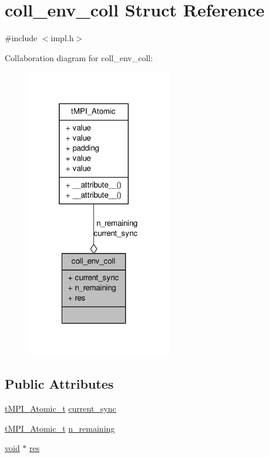 \hypertarget{structcoll__env__coll}{\section{coll\-\_\-env\-\_\-coll \-Struct \-Reference}
\label{structcoll__env__coll}
}


{\ttfamily \#include $<$impl.\-h$>$}



\-Collaboration diagram for coll\-\_\-env\-\_\-coll\-:
\nopagebreak
\begin{figure}[H]
\begin{center}
\leavevmode
\includegraphics[width=181pt]{structcoll__env__coll__coll__graph}
\end{center}
\end{figure}
\subsection*{\-Public \-Attributes}
\begin{DoxyCompactItemize}
\item 
\hyperlink{include_2thread__mpi_2atomic_2gcc_8h_a2c33794dc540e3b07cffc1f81a3fe4b4}{t\-M\-P\-I\-\_\-\-Atomic\-\_\-t} \hyperlink{structcoll__env__coll_aa9b2d9a0eda944f592443e26f2ede8de}{current\-\_\-sync}
\item 
\hyperlink{include_2thread__mpi_2atomic_2gcc_8h_a2c33794dc540e3b07cffc1f81a3fe4b4}{t\-M\-P\-I\-\_\-\-Atomic\-\_\-t} \hyperlink{structcoll__env__coll_ad61bbacc32b479bfe95d11e6884d7f07}{n\-\_\-remaining}
\item 
\hyperlink{nbnxn__kernel__simd__4xn__outer_8h_a8dc3f4a797ed992dff49d2fa3477eee8}{void} $\ast$ \hyperlink{structcoll__env__coll_a869a42318cfb2b77bed43a08339c8be2}{res}
\end{DoxyCompactItemize}


